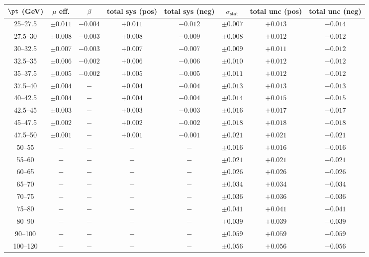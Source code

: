 \begin{tabular}{c|cc|cc|c|cc}
$\pt$ (GeV)  & $\mu$ eff. & $\beta$ & total sys (pos) & total sys (neg) & $\sigma_{\text{stat}}$ & total unc (pos) & total unc (neg) \\
\hline
25--27.5 & $\pm0.011$ & $-0.004$ & $+0.011$ & $-0.012$ & $\pm0.007$ & $+0.013$ & $-0.014$\\
27.5--30 & $\pm0.008$ & $-0.003$ & $+0.008$ & $-0.009$ & $\pm0.008$ & $+0.012$ & $-0.012$\\
30--32.5 & $\pm0.007$ & $-0.003$ & $+0.007$ & $-0.007$ & $\pm0.009$ & $+0.011$ & $-0.012$\\
32.5--35 & $\pm0.006$ & $-0.002$ & $+0.006$ & $-0.006$ & $\pm0.010$ & $+0.012$ & $-0.012$\\
35--37.5 & $\pm0.005$ & $-0.002$ & $+0.005$ & $-0.005$ & $\pm0.011$ & $+0.012$ & $-0.012$\\
37.5--40 & $\pm0.004$ & $-$ & $+0.004$ & $-0.004$ & $\pm0.013$ & $+0.013$ & $-0.013$\\
40--42.5 & $\pm0.004$ & $-$ & $+0.004$ & $-0.004$ & $\pm0.014$ & $+0.015$ & $-0.015$\\
42.5--45 & $\pm0.003$ & $-$ & $+0.003$ & $-0.003$ & $\pm0.016$ & $+0.017$ & $-0.017$\\
45--47.5 & $\pm0.002$ & $-$ & $+0.002$ & $-0.002$ & $\pm0.018$ & $+0.018$ & $-0.018$\\
47.5--50 & $\pm0.001$ & $-$ & $+0.001$ & $-0.001$ & $\pm0.021$ & $+0.021$ & $-0.021$\\
50--55 & $-$ & $-$ & $-$ & $-$ & $\pm0.016$ & $+0.016$ & $-0.016$\\
55--60 & $-$ & $-$ & $-$ & $-$ & $\pm0.021$ & $+0.021$ & $-0.021$\\
60--65 & $-$ & $-$ & $-$ & $-$ & $\pm0.026$ & $+0.026$ & $-0.026$\\
65--70 & $-$ & $-$ & $-$ & $-$ & $\pm0.034$ & $+0.034$ & $-0.034$\\
70--75 & $-$ & $-$ & $-$ & $-$ & $\pm0.036$ & $+0.036$ & $-0.036$\\
75--80 & $-$ & $-$ & $-$ & $-$ & $\pm0.041$ & $+0.041$ & $-0.041$\\
80--90 & $-$ & $-$ & $-$ & $-$ & $\pm0.039$ & $+0.039$ & $-0.039$\\
90--100 & $-$ & $-$ & $-$ & $-$ & $\pm0.059$ & $+0.059$ & $-0.059$\\
100--120 & $-$ & $-$ & $-$ & $-$ & $\pm0.056$ & $+0.056$ & $-0.056$\\
\end{tabular}
